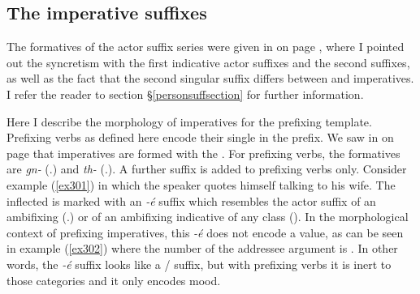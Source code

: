 \subsection{The imperative suffixes}\label{imperativesuffix}

The formatives of the  actor suffix series were given in  on page \pageref{perssuffimp}, where I pointed out the syncretism with the first  indicative actor suffixes and the second   suffixes, as well as the fact that the second singular suffix differs between  and  imperatives. I refer the reader to section {\S}\ref{personsuffsection} for further information.

Here I describe the morphology of imperatives for the prefixing template. Prefixing verbs as defined here encode their single  in the prefix. We saw in  on page \pageref{perspref2} that imperatives are formed with the \Bet{} . For prefixing verbs, the formatives are \emph{gn-} (\Ssg.\Imp) and \emph{th-} (\Snsg.\Imp). A further suffix is added to prefixing verbs only. Consider example (\ref{ex301}) in which the speaker quotes himself talking to his wife. The  inflected  is marked with an \emph{-é} suffix which resembles the actor suffix of an ambifixing   (\Ssg.\Imp) or of an ambifixing indicative of any  class (\Fsg). In the morphological context of prefixing imperatives, this \emph{-é} does not encode a  value, as can be seen in example (\ref{ex302}) where the number of the addressee argument is . In other words, the \emph{-é} suffix looks like a / suffix, but with prefixing verbs it is inert to those categories and it only encodes  mood.

